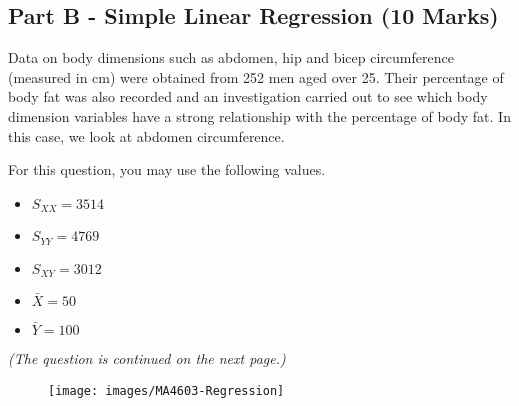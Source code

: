 \documentclass[a4paper,12pt]{article}
\begin{document}
\subsection*{Part B - Simple Linear Regression (10 Marks)}


Data on body dimensions such as abdomen, hip and bicep circumference (measured in cm) were obtained from 252 men aged over 25. Their percentage of body fat was also recorded and an investigation carried out to see which body dimension variables have a strong relationship with the percentage of body fat. In this case, we look at abdomen circumference. 

\medskip
\noindent For this question, you may use the following values.
\begin{multicols}{3}
	\begin{itemize}
		\item $S_{XX} = 3514$ \item $S_{YY} = 4769$ \item  $S_{XY} = 3012$ \item $\bar{X} = 50$  \item $\bar{Y} = 100$  
	\end{itemize}
\end{multicols}
\medskip
\textit{(The question is continued on the next page.)}


%	
%	
%	
%	
%	
%	
%	
%	
%	
%	
%	
%
\newpage
\begin{figure}[h!]
\centering
\texttt{[image: images/MA4603-Regression]}

\end{figure}
\end{document}
